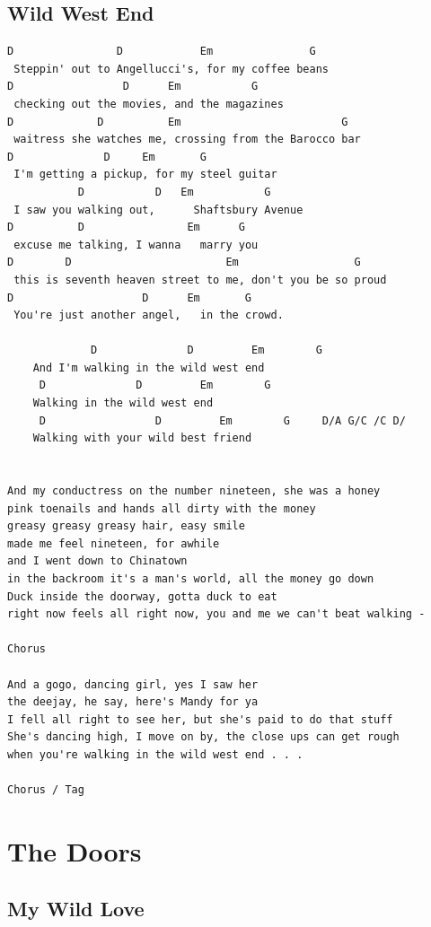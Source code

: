 \documentclass[a4paper]{article}
\begin{document}
\subsection{Wild West End} %
\label{sub:Wild West E}
\begin{Verbatim}[commandchars=\\\{\}]
D                D            Em               G
 Steppin' out to Angellucci's, for my coffee beans
D                 D      Em           G
 checking out the movies, and the magazines
D             D          Em                         G
 waitress she watches me, crossing from the Barocco bar
D              D     Em       G
 I'm getting a pickup, for my steel guitar
           D           D   Em           G
 I saw you walking out,      Shaftsbury Avenue
D          D                Em      G
 excuse me talking, I wanna   marry you
D        D                        Em                  G
 this is seventh heaven street to me, don't you be so proud
D                    D      Em       G
 You're just another angel,   in the crowd. 

             D              D         Em        G
	And I'm walking in the wild west end
     D              D         Em        G
	Walking in the wild west end
     D                 D         Em        G     D/A G/C /C D/
	Walking with your wild best friend


And my conductress on the number nineteen, she was a honey
pink toenails and hands all dirty with the money
greasy greasy greasy hair, easy smile
made me feel nineteen, for awhile
and I went down to Chinatown
in the backroom it's a man's world, all the money go down
Duck inside the doorway, gotta duck to eat
right now feels all right now, you and me we can't beat walking -

Chorus

And a gogo, dancing girl, yes I saw her
the deejay, he say, here's Mandy for ya
I fell all right to see her, but she's paid to do that stuff
She's dancing high, I move on by, the close ups can get rough
when you're walking in the wild west end . . .

Chorus / Tag
\end{Verbatim}
\newpage
\section{The Doors} %
\label{sec:The Doors}
\subsection{My Wild Love} %
\label{sub:My Wild Love}
\end{document}
